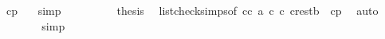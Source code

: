 \begin{isabellebody}
\ cp\ {}\ \isamarkupfalse%
\ simp\isanewline
\ \ \ \ \ \ \isamarkupfalse%
\ \isamarkupfalse%
\ {\isacharquery}{\kern0pt}thesis\ \isamarkupfalse%
\ list{\isacharunderscore}{\kern0pt}check{\isachardot}{\kern0pt}simps{\isacharparenleft}{\kern0pt}{}{\isacharparenright}{\kern0pt}{\isacharbrackleft}{\kern0pt}of\ {\isachardoublequoteopen}cc{\isachardoublequoteclose}\ {\isachardoublequoteopen}a{\isachardoublequoteclose}\ {\isachardoublequoteopen}c{}{\isachardoublequoteclose}\ {\isachardoublequoteopen}c{}{\isachardoublequoteclose}\ {\isachardoublequoteopen}crest{\isacharat}{\kern0pt}{\isacharbrackleft}{\kern0pt}b{\isacharbrackright}{\kern0pt}{\isachardoublequoteclose}{\isacharbrackright}{\kern0pt}\ {}\ cp\ \isamarkupfalse%
\ auto\isanewline
\ \ \ \ \isamarkupfalse%
\isanewline
\ \ \isamarkupfalse%
\isanewline
{}\isamarkupfalse%
{\isacharparenleft}{\kern0pt}simp{\isacharparenright}{\kern0pt}%
\endisatagproof
{\isafoldproof}%
%
\isadelimproof
\isanewline
%
\endisadelimproof
%
\isadelimtheory
\isanewline
%
\endisadelimtheory
%
\isatagtheory
{}\isamarkupfalse%
%
\endisatagtheory
{\isafoldtheory}%
%
\isadelimtheory
%
\endisadelimtheory
%
\end{isabellebody}%
\endinput
